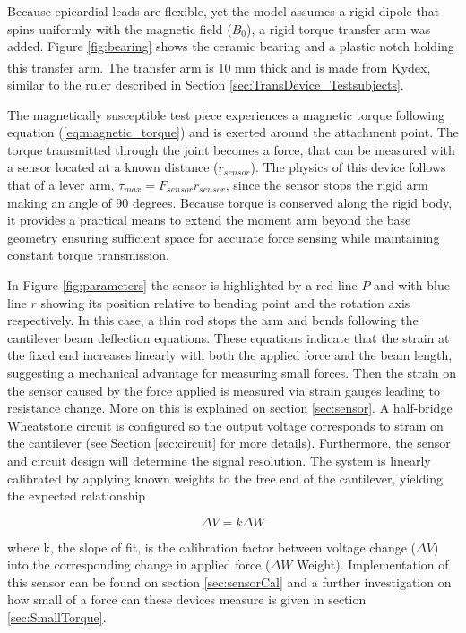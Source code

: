 Because epicardial leads are flexible, yet the model assumes a rigid dipole that spins uniformly with the magnetic field ($B_0$), a rigid torque transfer arm was added. Figure \ref{fig:bearing} shows the ceramic bearing and a plastic notch holding this transfer arm. The transfer arm is 10 mm thick and is made from Kydex\textsuperscript{\texttrademark}, similar to the ruler described in Section \ref{sec:TransDevice_Testsubjects}.

The magnetically susceptible test piece experiences a magnetic torque following equation (\ref{eq:magnetic_torque}) and is exerted around the attachment point. The torque transmitted through the joint becomes a force, that can be measured with a sensor located at a known distance ($r_{sensor}$). The physics of this device follows that of a lever arm, 
	$\tau_{max} = F_{sensor} r_{sensor}$,
\noindent since the sensor stops the rigid arm making an angle of 90 degrees. Because torque is conserved along the rigid body, it provides a practical means to extend the moment arm beyond the base geometry ensuring sufficient space for accurate force sensing while maintaining constant torque transmission. 

In Figure \ref{fig:parameters} the sensor is highlighted by a red line $P$ and with blue line $r$ showing its position relative to bending point and the rotation axis respectively. In this case, a thin rod stops the arm and bends following the cantilever beam deflection equations. These equations indicate that the strain at the fixed end increases linearly with both the applied force and the beam length, suggesting a mechanical advantage for measuring small forces. Then the strain on the sensor caused by the force applied is measured via strain gauges leading to resistance change. More on this is explained on section \ref{sec:sensor}.  A half-bridge Wheatstone circuit is configured so the output voltage corresponds to strain on the cantilever (see Section \ref{sec:circuit} for more details). Furthermore, the sensor and circuit design will determine the signal resolution. The system is linearly calibrated by applying known weights to the free end of the cantilever, yielding the expected relationship

\begin{equation}
	\Delta V = k \Delta W
	\label{eq:torqueCal}
\end{equation}

\noindent where k, the slope of fit, is the calibration factor between voltage change ($\Delta V$) into the corresponding change in applied force ($\Delta W$ Weight). Implementation of this sensor can be found on section \ref{sec:sensorCal} and a further investigation on how small of a force can these devices measure is given in section \ref{sec:SmallTorque}.